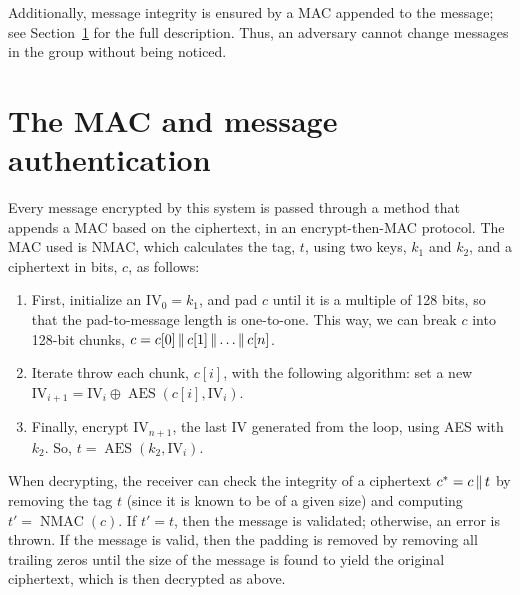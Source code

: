 \documentclass{amsart}
\DeclareMathOperator{\AES}{AES}
\begin{document}
Additionally, message integrity is ensured by a MAC appended to the message; see Section~\ref{mac} for the full description. Thus, an adversary cannot change messages in the group without being noticed.
\section{The MAC and message authentication}
\label{mac}
Every message encrypted by this system is passed through a method that appends a MAC based on the ciphertext, in an encrypt-then-MAC protocol. The MAC used is NMAC, which calculates the tag, $t$, using two keys, $k_1$ and $k_2$, and a ciphertext in bits, $c$, as follows:
\begin{enumerate}
  \item First, initialize an $\mathrm{IV}_0 = k_1$, and pad $c$ until it is a multiple of 128 bits, so that the pad-to-message length is one-to-one. This way, we can break $c$ into 128-bit chunks, $c = c[0]\operatorname{\|} c[1]\operatorname{\|} \dots \operatorname{\|} c[n]$.
  \item Iterate throw each chunk, $c[i]$, with the following algorithm: set a new $\mathrm{IV}_{i+1} = \mathrm{IV}_i \oplus \AES(c[i],\mathrm{IV}_i)$.
  \item Finally, encrypt $\mathrm{IV}_{n+1}$, the last IV generated from the loop, using AES with $k_2$. So, $t = \AES(k_2, \mathrm{IV}_i)$.
\end{enumerate}


When decrypting, the receiver can check the integrity of a ciphertext $c^* = c\operatorname{\|} t$ by removing the tag $t$ (since it is known to be of a given size) and computing $t' = \operatorname{NMAC}(c)$. If $t' = t$, then the message is validated; otherwise, an error is thrown. If the message is valid, then the padding is removed by removing all trailing zeros until the size of the message is found to yield the original ciphertext, which is then decrypted as above.
\end{document}
